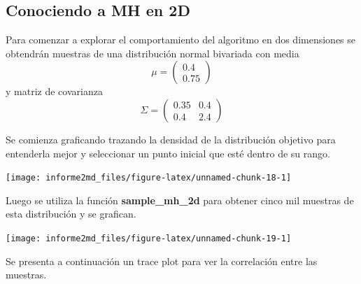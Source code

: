 \documentclass[
]{article}
\begin{document}
\hypertarget{conociendo-a-mh-en-2d}{%
\subsection{Conociendo a MH en 2D}\label{conociendo-a-mh-en-2d}}

Para comenzar a explorar el comportamiento del algoritmo en dos
dimensiones se obtendrán muestras de una distribución normal bivariada
con media \[ \mu = \begin{pmatrix}
   0.4 \\
   0.75
\end{pmatrix} \] y matriz de covarianza \[\Sigma=\begin{pmatrix}
   0.35 & 0.4 \\
   0.4 & 2.4
\end{pmatrix} \]

Se comienza graficando trazando la densidad de la distribución objetivo
para entenderla mejor y seleccionar un punto inicial que esté dentro de
su rango.

\begin{center}\texttt{[image: informe2md\_files/figure-latex/unnamed-chunk-18-1]} \end{center}

Luego se utiliza la función \textbf{sample\_mh\_2d} para obtener cinco
mil muestras de esta distribución y se grafican.

\begin{center}\texttt{[image: informe2md\_files/figure-latex/unnamed-chunk-19-1]} \end{center}

Se presenta a continuación un trace plot para ver la correlación entre
las muestras.
\end{document}
